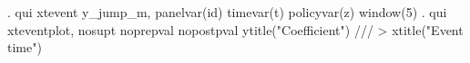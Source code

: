 . qui xtevent y_jump_m, panelvar(id) timevar(t) policyvar(z) window(5) 
{\smallskip}
. qui xteventplot, nosupt noprepval nopostpval ytitle("Coefficient") ///
>         xtitle("Event time")
{\smallskip}
